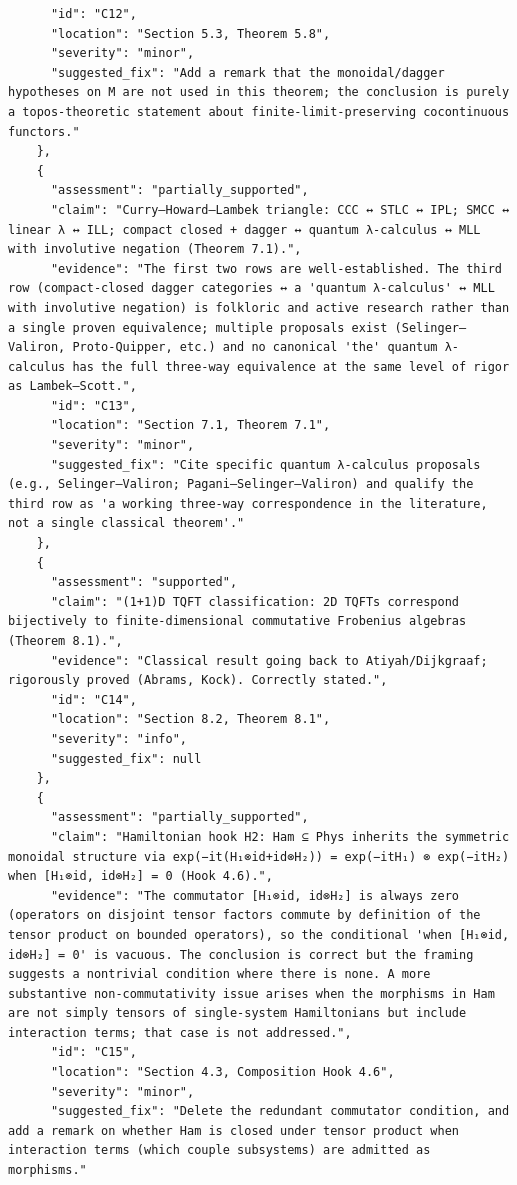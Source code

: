 \documentclass[11pt]{article}
\begin{document}
\begin{verbatim}
      "id": "C12",
      "location": "Section 5.3, Theorem 5.8",
      "severity": "minor",
      "suggested_fix": "Add a remark that the monoidal/dagger hypotheses on M are not used in this theorem; the conclusion is purely a topos-theoretic statement about finite-limit-preserving cocontinuous functors."
    },
    {
      "assessment": "partially_supported",
      "claim": "Curry–Howard–Lambek triangle: CCC ↔ STLC ↔ IPL; SMCC ↔ linear λ ↔ ILL; compact closed + dagger ↔ quantum λ-calculus ↔ MLL with involutive negation (Theorem 7.1).",
      "evidence": "The first two rows are well-established. The third row (compact-closed dagger categories ↔ a 'quantum λ-calculus' ↔ MLL with involutive negation) is folkloric and active research rather than a single proven equivalence; multiple proposals exist (Selinger–Valiron, Proto-Quipper, etc.) and no canonical 'the' quantum λ-calculus has the full three-way equivalence at the same level of rigor as Lambek–Scott.",
      "id": "C13",
      "location": "Section 7.1, Theorem 7.1",
      "severity": "minor",
      "suggested_fix": "Cite specific quantum λ-calculus proposals (e.g., Selinger–Valiron; Pagani–Selinger–Valiron) and qualify the third row as 'a working three-way correspondence in the literature, not a single classical theorem'."
    },
    {
      "assessment": "supported",
      "claim": "(1+1)D TQFT classification: 2D TQFTs correspond bijectively to finite-dimensional commutative Frobenius algebras (Theorem 8.1).",
      "evidence": "Classical result going back to Atiyah/Dijkgraaf; rigorously proved (Abrams, Kock). Correctly stated.",
      "id": "C14",
      "location": "Section 8.2, Theorem 8.1",
      "severity": "info",
      "suggested_fix": null
    },
    {
      "assessment": "partially_supported",
      "claim": "Hamiltonian hook H2: Ham ⊆ Phys inherits the symmetric monoidal structure via exp(−it(H₁⊗id+id⊗H₂)) = exp(−itH₁) ⊗ exp(−itH₂) when [H₁⊗id, id⊗H₂] = 0 (Hook 4.6).",
      "evidence": "The commutator [H₁⊗id, id⊗H₂] is always zero (operators on disjoint tensor factors commute by definition of the tensor product on bounded operators), so the conditional 'when [H₁⊗id, id⊗H₂] = 0' is vacuous. The conclusion is correct but the framing suggests a nontrivial condition where there is none. A more substantive non-commutativity issue arises when the morphisms in Ham are not simply tensors of single-system Hamiltonians but include interaction terms; that case is not addressed.",
      "id": "C15",
      "location": "Section 4.3, Composition Hook 4.6",
      "severity": "minor",
      "suggested_fix": "Delete the redundant commutator condition, and add a remark on whether Ham is closed under tensor product when interaction terms (which couple subsystems) are admitted as morphisms."

\end{verbatim}
\end{document}
